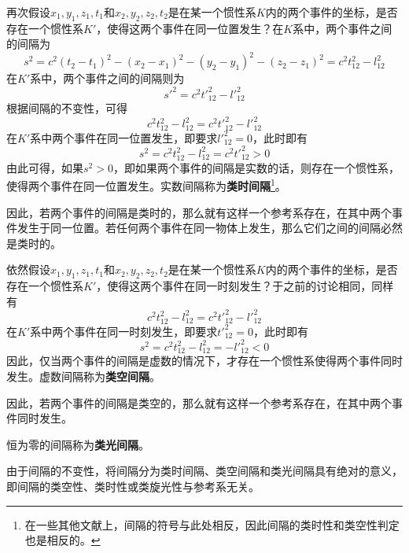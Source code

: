 再次假设$x_1,y_1,z_1,t_1$和$x_2,y_2,z_2,t_2$是在某一个惯性系$K$内的两个事件的坐标，是否存在一个惯性系$K'$，使得这两个事件在同一位置发生？在$K$系中，两个事件之间的间隔为
\begin{equation*}
	s^2 = c^2(t_2-t_1)^2 - (x_2-x_1)^2 - (y_2-y_1)^2 - (z_2-z_1)^2 = c^2 t_{12}^2 - l_{12}^2
\end{equation*}
在$K'$系中，两个事件之间的间隔则为
\begin{equation*}
	s'^2 = c^2 t'^2_{12} - l'^2_{12}
\end{equation*}
根据间隔的不变性，可得
\begin{equation*}
	c^2 t_{12}^2 - l_{12}^2 = c^2 t'^2_{12} - l'^2_{12}
\end{equation*}
在$K'$系中两个事件在同一位置发生，即要求$l'^2_{12}=0$，此时即有
\begin{equation*}
	s^2 = c^2 t_{12}^2 - l_{12}^2 = c^2 t'^2_{12} > 0
\end{equation*}
由此可得，如果$s^2>0$，即如果两个事件的间隔是实数的话，则存在一个惯性系，使得两个事件在同一位置发生。实数间隔称为{\bf 类时间隔}\footnote{在一些其他文献上，间隔的符号与此处相反，因此间隔的类时性和类空性判定也是相反的。}。

因此，若两个事件的间隔是类时的，那么就有这样一个参考系存在，在其中两个事件发生于同一位置。若任何两个事件在同一物体上发生，那么它们之间的间隔必然是类时的。

依然假设$x_1,y_1,z_1,t_1$和$x_2,y_2,z_2,t_2$是在某一个惯性系$K$内的两个事件的坐标，是否存在一个惯性系$K'$，使得这两个事件在同一时刻发生？于之前的讨论相同，同样有
\begin{equation*}
	c^2 t_{12}^2 - l_{12}^2 = c^2 t'^2_{12} - l'^2_{12}
\end{equation*}
在$K'$系中两个事件在同一时刻发生，即要求$t'^2_{12}=0$，此时即有
\begin{equation*}
	s^2 = c^2 t_{12}^2 - l_{12}^2 = -l'^2_{12} < 0 
\end{equation*}
因此，仅当两个事件的间隔是虚数的情况下，才存在一个惯性系使得两个事件同时发生。虚数间隔称为{\bf 类空间隔}。

因此，若两个事件的间隔是类空的，那么就有这样一个参考系存在，在其中两个事件同时发生。

恒为零的间隔称为{\bf 类光间隔}。

由于间隔的不变性，将间隔分为类时间隔、类空间隔和类光间隔具有绝对的意义，即间隔的类空性、类时性或类旋光性与参考系无关。

